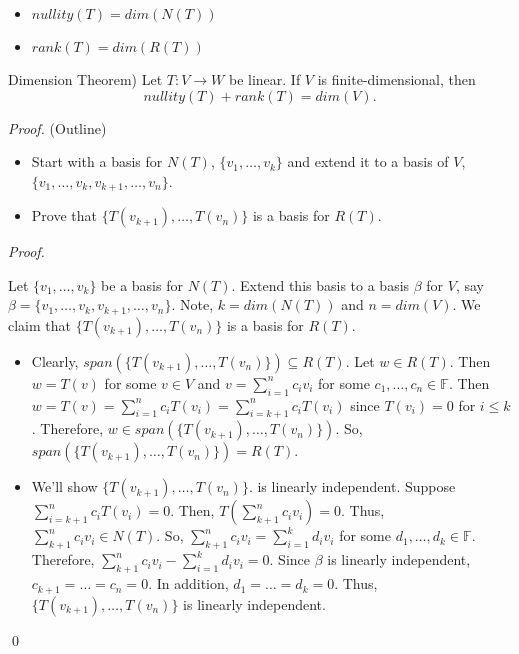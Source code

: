 \documentclass[12pt]{article}
\newenvironment{theorem}[2][Theorem]{\begin{trivlist}
\item[\hskip \labelsep {\bfseries #1}\hskip \labelsep {\bfseries #2.}]}{\end{trivlist}}
\newenvironment{sol}
    {\emph{Proof.}
    }
    {
    \qed
    }
\begin{document}
\begin{itemize}
    \item $nullity(T) = dim(N(T))$
    \item $rank(T) = dim(R(T))$
\end{itemize}

\begin{theorem}{2.3}
(Dimension Theorem) Let $T : V \to W$ be linear. If $V$ is finite-dimensional, then $$nullity(T) + rank(T) = dim(V).$$
\end{theorem}

\textit{Proof.} (Outline)
\begin{itemize}
    \item Start with a basis for $N(T)$, $\{v_1, \dots, v_k\}$ and extend it to a basis of $V$, \newline
    $\{v_1, \dots, v_k, v_{k+1}, \dots, v_n\}$.
    \item Prove that $\{T(v_{k+1}), \dots, T(v_n)\}$ is a basis for $R(T)$.
\end{itemize}

\begin{sol}
Let $\{v_1, \dots, v_k\}$ be a basis for $N(T)$. Extend this basis to a basis $\beta$ for $V$, say $\beta = \{v_1, \dots, v_k, v_{k+1}, \dots, v_n\}$. Note, $k = dim(N(T))$ and $n = dim(V)$. We claim that $\{T(v_{k + 1}), \dots, T(v_n)\}$ is a basis for $R(T)$.
\begin{itemize}
    \item[(1)] Clearly, $span(\{T(v_{k + 1}), \dots, T(v_n)\}) \subseteq R(T)$. Let $w \in R(T)$. Then $w = T(v)$ for some $v \in V$ and $v = \sum_{i = 1}^nc_iv_i$ for some $c_1, \dots, c_n \in \mathbb{F}$. Then $w = T(v) = \sum_{i = 1}^n c_iT(v_i) = \sum_{i = k+1}^nc_iT(v_i)$ since $T(v_i) = 0$ for $i \leq k$. Therefore, $w \in span(\{T(v_{k + 1}), \dots, T(v_n)\})$. So, $span(\{T(v_{k + 1}), \dots, T(v_n)\}) = R(T)$.
    
    \item[(2)] We'll show $\{T(v_{k + 1}), \dots, T(v_n)\}$. is linearly independent. Suppose $\sum_{i = k+1}^nc_iT(v_i) = 0$. Then, $T\left( \sum_{k + 1}^n c_iv_i \right) = 0$. Thus, $\sum_{k + 1}^n c_iv_i \in N(T)$. So, $\sum_{k + 1}^n c_iv_i = \sum_{i = 1}^kd_iv_i$ for some $d_1, \dots, d_k \in \mathbb{F}$. Therefore, $\sum_{k + 1}^n c_iv_i - \sum_{i = 1}^kd_iv_i = 0$. Since $\beta$ is linearly independent, $c_{k + 1} = \dots = c_n = 0$. In addition, $d_1 = \dots = d_k = 0$. Thus, $\{T(v_{k + 1}), \dots, T(v_n)\}$ is linearly independent.
\end{itemize}
\end{sol}
\end{document}
